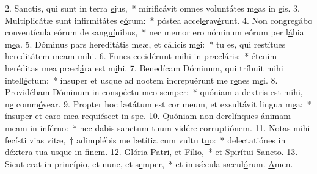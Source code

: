 2. Sanctis, qui sunt in terra \uline{e}jus,~* mirificávit omnes voluntátes m\uline{e}as in \uline{e}is.
3. Multiplicátæ sunt infirmitátes e\uline{ó}rum:~* póstea accel\uline{e}rav\uline{é}runt.
4. Non congregábo conventícula eórum de san\uline{guí}nibus,~* nec memor ero nóminum eórum per l\uline{á}bia m\uline{e}a.
5. Dóminus pars hereditátis meæ, et cálicis m\uline{e}i:~* tu es, qui restítues hereditátem m\uline{e}am m\uline{i}hi.
6. Funes cecidérunt mihi in præcl\uline{á}ris:~* étenim heréditas mea præcl\uline{á}ra est m\uline{i}hi.
7. Benedícam Dóminum, qui tríbuit mihi intell\uline{é}ctum:~* ínsuper et usque ad noctem increpuérunt me r\uline{e}nes m\uline{e}i.
8. Providébam Dóminum in conspéctu meo s\uline{e}mper:~* quóniam a dextris est mihi, n\uline{e} comm\uline{ó}vear.
9. Propter hoc lætátum est cor meum, et exsultávit lingua m\uline{e}a:~* ínsuper et caro mea requi\uline{é}scet \uline{i}n spe.
10. Quóniam non derelínques ánimam meam in inf\uline{é}rno:~* nec dabis sanctum tuum vidére corr\uline{u}pti\uline{ó}nem.
11. Notas mihi fecísti vias vitæ,~† adimplébis me lætítia cum vultu t\uline{u}o:~* delectatiónes in déxtera tua \uline{u}sque in f\uline{i}nem.
12. Glória Patri, et F\uline{í}lio,~* et Spir\uline{í}tui S\uline{a}ncto.
13. Sicut erat in princípio, et nunc, et s\uline{e}mper,~* et in sǽcula sæcul\uline{ó}rum. \uline{A}men.
